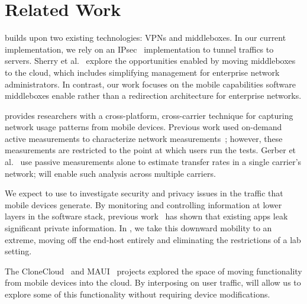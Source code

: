 \section{Related Work}

\meddle builds upon two existing technologies: VPNs and middleboxes. 
In our current implementation, we rely on an IPsec~\cite{rfc:ipsec} implementation 
to tunnel traffics to \meddle servers. Sherry et al.~\cite{sherry:middleboxes} explore the opportunities 
enabled by moving middleboxes to the cloud, which includes simplifying management 
for enterprise network administrators. In contrast, our work focuses on the mobile capabilities 
software middleboxes enable rather than a redirection architecture for enterprise networks. 

\meddle provides researchers with a cross-platform, cross-carrier technique 
for capturing network usage patterns from mobile devices. Previous work 
used on-demand active measurements to characterize network measurements~\cite{wang:middleboxes,speedtest}; 
however, these measurements are restricted to the point at which users run 
the tests. Gerber et al.~\cite{gerber:passivespeed} use passive measurements alone 
to estimate transfer rates in a single carrier's network; \meddle 
will enable such analysis across multiple carriers.

We expect to use \meddle to investigate security and privacy issues in the 
traffic that mobile devices generate. By monitoring and controlling 
information at lower layers in the software stack, previous work~\cite{enck:taintdroid,hornyack:appfence,wsj:apps-watching-you} has shown 
that existing apps leak significant private information. In \meddle, we take 
this downward mobility to an extreme, moving off the end-host entirely and 
eliminating the restrictions of a lab setting.

The CloneCloud~\cite{chun:clonecloud} and MAUI~\cite{cuervo:maui} projects explored the space of moving functionality 
from mobile devices into the cloud. By interposing on user traffic, \meddle will allow us to explore some of this 
functionality without requiring device modifications.

